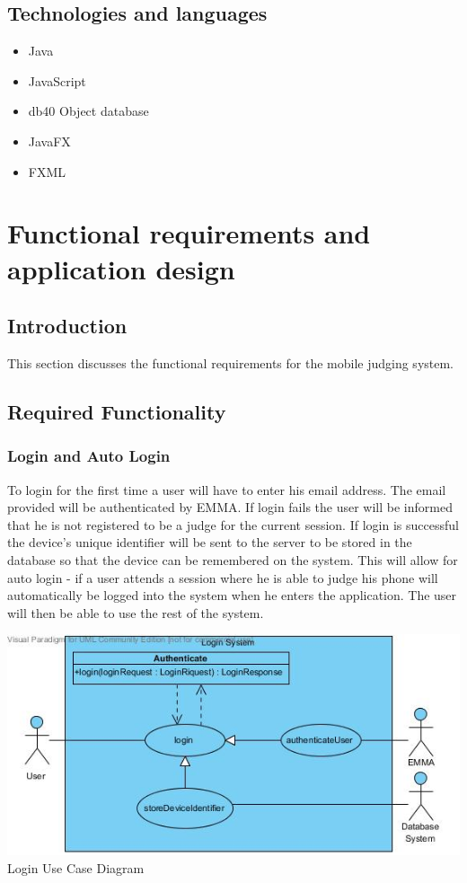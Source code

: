 \documentclass[10pt,a4paper]{article}
\begin{document}
\subsection{Technologies and languages}
\begin{itemize}
\item Java
\item JavaScript
\item db40 Object database
\item JavaFX
\item FXML
\end{itemize}

\pagebreak
\section{Functional requirements and application design}
\subsection{Introduction}
This section discusses the functional requirements for the mobile judging system.
\subsection{Required Functionality}
\subsubsection{Login and Auto Login}
To login for the first time a user will have to enter his email address. The email provided will be authenticated by EMMA. If login fails the user will be informed that he is not registered to be a judge for the current session. If login is successful the device's unique identifier will be sent to the server to be stored in the database so that the device can be remembered on the system. This will allow for auto login - if a user attends a session where he is able to judge his phone will automatically be logged into the system when he enters the application. The user will then be able to use the rest of the system.

\begin{center}
\advance\leftskip-1.3cm
\includegraphics[width=160mm]{Pictures/Login.jpg} 
Login Use Case Diagram 
\end{center}
\end{document}
